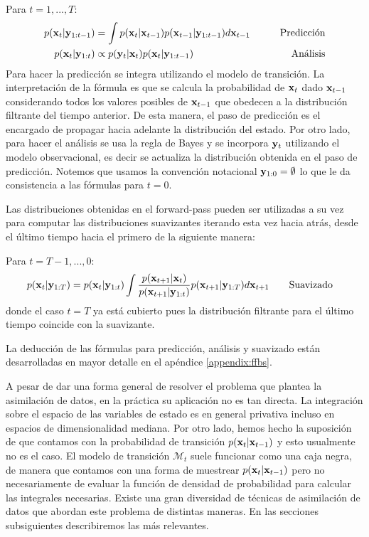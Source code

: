 Para $t = 1, ..., T$:
\begin{align}
    p(\mathbf{x}_t | \mathbf{y}_{1:t-1}) &= \int p(\mathbf{x}_t | \mathbf{x}_{t-1}) p(\mathbf{x}_{t-1} | \mathbf{y}_{1:t-1}) d\mathbf{x}_{t-1} \hspace{2em} &\text{Predicción} \label{eq:forward_pred} \\
    p(\mathbf{x}_t | \mathbf{y}_{1:t}) &\propto p(\mathbf{y}_t | \mathbf{x}_t) p(\mathbf{x}_t | \mathbf{y}_{1:t-1}) \hspace{2em} &\text{Análisis} \label{eq:forward_filt}
\end{align}
Para hacer la predicción se integra utilizando el modelo de transición. La interpretación de la fórmula es que se calcula la probabilidad de $\mathbf{x}_t$ dado $\mathbf{x}_{t-1}$ considerando todos los valores posibles de $\mathbf{x}_{t-1}$ que obedecen a la distribución filtrante del tiempo anterior. De esta manera, el paso de predicción es el encargado de propagar hacia adelante la distribución del estado. Por otro lado, para hacer el análisis se usa la regla de Bayes y se incorpora $\mathbf{y}_t$ utilizando el modelo observacional, es decir se actualiza la distribución obtenida en el paso de predicción. Notemos que usamos la convención notacional $\mathbf{y}_{1:0} = \emptyset$ lo que le da consistencia a las fórmulas para $t = 0$.

Las distribuciones obtenidas en el forward-pass pueden ser utilizadas a su vez para computar las distribuciones suavizantes iterando esta vez hacia atrás, desde el último tiempo hacia el primero de la siguiente manera:

Para $t = T-1, ..., 0$:
\begin{align}
    p(\mathbf{x}_t | \mathbf{y}_{1:T}) = p(\mathbf{x}_t |\mathbf{y}_{1:t}) \int \frac{p(\mathbf{x}_{t+1} | \mathbf{x}_t)}
    {p(\mathbf{x}_{t+1} |\mathbf{y}_{1:t})}
    p(\mathbf{x}_{t+1} | \mathbf{y}_{1:T}) d\mathbf{x}_{t+1} \hspace{2em} &\text{Suavizado}
\end{align}
donde el caso $t = T$ ya está cubierto pues la distribución filtrante para el último tiempo coincide con la suavizante.

La deducción de las fórmulas para predicción, análisis y suavizado están desarrolladas en mayor detalle en el apéndice \ref{appendix:ffbs}.

A pesar de dar una forma general de resolver el problema que plantea la asimilación de datos, en la práctica su aplicación no es tan directa. La integración sobre el espacio de las variables de estado es en general privativa incluso en espacios de dimensionalidad mediana. Por otro lado, hemos hecho la suposición de que contamos con la probabilidad de transición $p(\mathbf{x}_t | \mathbf{x}_{t-1})$ y esto usualmente no es el caso. El modelo de transición $\mathcal{M}_t$ suele funcionar como una caja negra, de manera que contamos con una forma de muestrear $p(\mathbf{x}_t | \mathbf{x}_{t-1})$ pero no necesariamente de evaluar la función de densidad de probabilidad para calcular las integrales necesarias. Existe una gran diversidad de técnicas de asimilación de datos que abordan este problema de distintas maneras. En las secciones subsiguientes describiremos las más relevantes.

